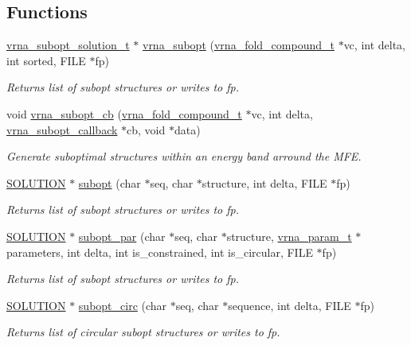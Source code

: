 \subsection*{Functions}
\begin{DoxyCompactItemize}
\item 
\mbox{\hyperlink{subopt_8h_a01ae9a0f27d245d89f705afd843fc457}{vrna\+\_\+subopt\+\_\+solution\+\_\+t}} $\ast$ \mbox{\hyperlink{group__subopt__wuchty_ga0f11d738fb8c8b1885a90c11c8931ff6}{vrna\+\_\+subopt}} (\mbox{\hyperlink{group__fold__compound_ga1b0cef17fd40466cef5968eaeeff6166}{vrna\+\_\+fold\+\_\+compound\+\_\+t}} $\ast$vc, int delta, int sorted, F\+I\+LE $\ast$fp)
\begin{DoxyCompactList}\small\item\em Returns list of subopt structures or writes to fp. \end{DoxyCompactList}\item 
void \mbox{\hyperlink{group__subopt__wuchty_ga1053837e6b6f158093508f8a70998352}{vrna\+\_\+subopt\+\_\+cb}} (\mbox{\hyperlink{group__fold__compound_ga1b0cef17fd40466cef5968eaeeff6166}{vrna\+\_\+fold\+\_\+compound\+\_\+t}} $\ast$vc, int delta, \mbox{\hyperlink{group__subopt__wuchty_gaa0270c66d04f59e750401695b8282e04}{vrna\+\_\+subopt\+\_\+callback}} $\ast$cb, void $\ast$data)
\begin{DoxyCompactList}\small\item\em Generate suboptimal structures within an energy band arround the M\+FE. \end{DoxyCompactList}\item 
\mbox{\hyperlink{subopt_8h_aa0f46ff02e1017469cf902d02ecd7f9a}{S\+O\+L\+U\+T\+I\+ON}} $\ast$ \mbox{\hyperlink{group__subopt__wuchty_ga700f662506a233e42dd7fda74fafd40e}{subopt}} (char $\ast$seq, char $\ast$structure, int delta, F\+I\+LE $\ast$fp)
\begin{DoxyCompactList}\small\item\em Returns list of subopt structures or writes to fp. \end{DoxyCompactList}\item 
\mbox{\hyperlink{subopt_8h_aa0f46ff02e1017469cf902d02ecd7f9a}{S\+O\+L\+U\+T\+I\+ON}} $\ast$ \mbox{\hyperlink{group__subopt__wuchty_gaa1e1e7031a948ebcb39a9d58d1e9842c}{subopt\+\_\+par}} (char $\ast$seq, char $\ast$structure, \mbox{\hyperlink{group__energy__parameters_ga8a69ca7d787e4fd6079914f5343a1f35}{vrna\+\_\+param\+\_\+t}} $\ast$parameters, int delta, int is\+\_\+constrained, int is\+\_\+circular, F\+I\+LE $\ast$fp)
\begin{DoxyCompactList}\small\item\em Returns list of subopt structures or writes to fp. \end{DoxyCompactList}\item 
\mbox{\hyperlink{subopt_8h_aa0f46ff02e1017469cf902d02ecd7f9a}{S\+O\+L\+U\+T\+I\+ON}} $\ast$ \mbox{\hyperlink{group__subopt__wuchty_ga8634516e4740e0b6c9a46d2bae940340}{subopt\+\_\+circ}} (char $\ast$seq, char $\ast$sequence, int delta, F\+I\+LE $\ast$fp)
\begin{DoxyCompactList}\small\item\em Returns list of circular subopt structures or writes to fp. \end{DoxyCompactList}\end{DoxyCompactItemize}

